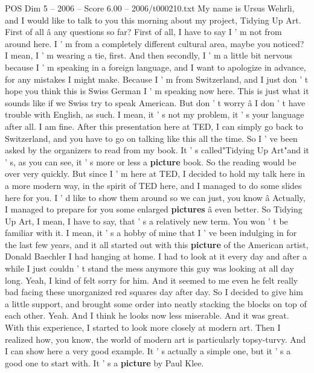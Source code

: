 \begin{textsample}{POS Dim 5 – 2006 – Score 6.00 – 2006/t000210.txt}  \label{ex:f5_pos_020}
My name is Ursus Wehrli, and I would like to talk to you this morning about my project, Tidying Up Art.
First of all â any questions so far?
First of all, I have to say I ' m not from around here.
I ' m from a completely different cultural area, maybe you noticed?
I mean, I ' m wearing a tie, first.
And then secondly, I ' m a little bit nervous because I ' m speaking in a foreign language, and I want to apologize in advance, for any mistakes I might make.
Because I ' m from Switzerland, and I just don ' t hope you think this is Swiss German I ' m speaking now here.
This is just what it sounds like if we Swiss try to speak American.
But don ' t worry â I don ' t have trouble with English, as such.
I mean, it ' s not my problem, it ' s your language after all.
I am fine.
After this presentation here at TED, I can simply go back to Switzerland, and you have to go on talking like this all the time.
So I ' ve been asked by the organizers to read from my book.
It ' s called"Tidying Up Art"and it ' s, as you can see, it ' s more or less a \textbf{picture} book.
So the reading would be over very quickly.
But since I ' m here at TED, I decided to hold my talk here in a more modern way, in the spirit of TED here, and I managed to do some slides here for you.
I ' d like to show them around so we can just, you know â Actually, I managed to prepare for you some enlarged \textbf{pictures} â even better.
So Tidying Up Art, I mean, I have to say, that ' s a relatively new term.
You won ' t be familiar with it.
I mean, it ' s a hobby of mine that I ' ve been indulging in for the last few years, and it all started out with this \textbf{picture} of the American artist, Donald Baechler I had hanging at home.
I had to look at it every day and after a while I just couldn ' t stand the mess anymore this guy was looking at all day long.
Yeah, I kind of felt sorry for him.
And it seemed to me even he felt really bad facing these unorganized red squares day after day.
So I decided to give him a little support, and brought some order into neatly stacking the blocks on top of each other.
Yeah.
And I think he looks now less miserable.
And it was great.
With this experience, I started to look more closely at modern art.
Then I realized how, you know, the world of modern art is particularly topsy-turvy.
And I can show here a very good example.
It ' s actually a simple one, but it ' s a good one to start with.
It ' s a \textbf{picture} by Paul Klee.

\end{textsample}
